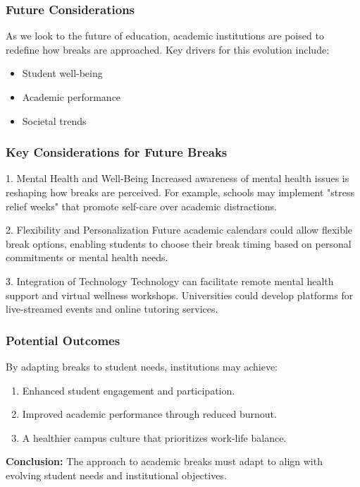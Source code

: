 \documentclass[aspectratio=169]{beamer}
\begin{document}
\begin{frame}[fragile]
    \frametitle{Future Considerations}
    As we look to the future of education, academic institutions are poised to redefine how breaks are approached. Key drivers for this evolution include:
    \begin{itemize}
        \item Student well-being
        \item Academic performance
        \item Societal trends
    \end{itemize}
\end{frame}

\begin{frame}[fragile]
    \frametitle{Key Considerations for Future Breaks}
    
    \begin{block}{1. Mental Health and Well-Being}
        Increased awareness of mental health issues is reshaping how breaks are perceived. For example, schools may implement "stress relief weeks" that promote self-care over academic distractions.
    \end{block}

    \begin{block}{2. Flexibility and Personalization}
        Future academic calendars could allow flexible break options, enabling students to choose their break timing based on personal commitments or mental health needs.
    \end{block}

    \begin{block}{3. Integration of Technology}
        Technology can facilitate remote mental health support and virtual wellness workshops. Universities could develop platforms for live-streamed events and online tutoring services.
    \end{block}
\end{frame}

\begin{frame}[fragile]
    \frametitle{Potential Outcomes}
    By adapting breaks to student needs, institutions may achieve:
    \begin{enumerate}
        \item Enhanced student engagement and participation.
        \item Improved academic performance through reduced burnout.
        \item A healthier campus culture that prioritizes work-life balance.
    \end{enumerate}
    
    \textbf{Conclusion:} The approach to academic breaks must adapt to align with evolving student needs and institutional objectives.
\end{frame}
\end{document}
